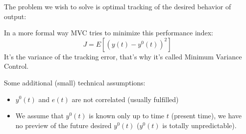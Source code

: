 The problem we wish to solve is optimal tracking of the desired behavior of output:
\begin{figure}[H]
    \centering
\end{figure}

In a more formal way MVC tries to minimize this performance index:
\[
    J = E\left[ (y(t) - y^0(t))^2 \right]
\]
It's the variance of the tracking error, that's why it's called Minimum Variance Control.

Some additional (small) technical assumptions:
\begin{itemize}
    \item $y^0(t)$ and $e(t)$ are not correlated (usually fulfilled)
    \item We assume that $y^0(t)$ is known only up to time $t$ (present time), we have no preview of the future desired $y^0(t)$ ($y^0(t)$ is totally unpredictable).
\end{itemize}

